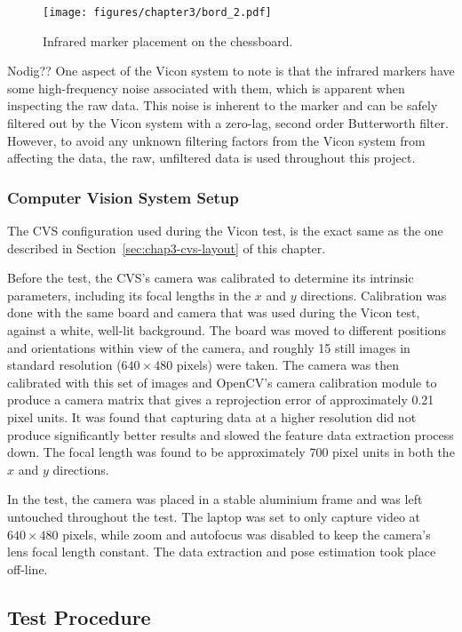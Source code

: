 \begin{figure}
   \centering 
   \texttt{[image: figures/chapter3/bord\_2.pdf]}
   \caption{Infrared marker placement on the chessboard.}
\label{fig:chap3-board-marker-placement}
\end{figure}

Nodig?? One aspect of the Vicon system to note is that the infrared markers have some high-frequency noise associated with them, which is apparent when inspecting the raw data. This noise is inherent to the marker and can be safely filtered out by the Vicon system with a zero-lag, second order Butterworth filter. However, to avoid any unknown filtering factors from the Vicon system from affecting the data, the raw, unfiltered data is used throughout this project. 

\subsubsection{Computer Vision System Setup}

The CVS configuration used during the Vicon test, is the exact same as the one described in Section~\ref{sec:chap3-cvs-layout} of this chapter.

Before the test, the CVS's camera was calibrated to determine its intrinsic parameters, including its focal lengths in the $x$ and $y$ directions. Calibration was done with the same board and camera that was used during the Vicon test, against a white, well-lit background. The board was moved to different positions and orientations within view of the camera, and roughly 15 still images in standard resolution ($640\times480$ pixels) were taken. The camera was then calibrated with this set of images and OpenCV's camera calibration module to produce a camera matrix that gives a reprojection error of approximately 0.21 pixel units. It was found that capturing data at a higher resolution did not produce significantly better results and slowed the feature data extraction process down. The focal length was found to be approximately 700 pixel units in both the $x$ and $y$ directions.

In the test, the camera was placed in a stable aluminium frame and was left untouched throughout the test. The laptop was set to only capture video at $640\times480$ pixels, while zoom and autofocus was disabled to keep the camera's lens focal length constant. The data extraction and pose estimation took place off-line. 

\subsection{Test Procedure}

